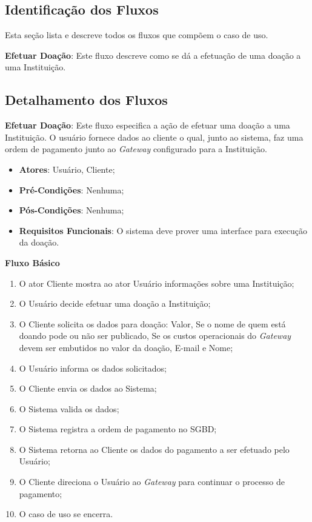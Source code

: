 \begin{anexosenv}
\subsection*{Identificação dos Fluxos}
Esta seção lista e descreve todos os fluxos que compõem o caso de uso.
\begin{lista}
  \item \textbf{Efetuar Doação}: Este fluxo descreve como se dá a efetuação de uma doação a uma Instituição.
\end{lista}

\subsection*{Detalhamento dos Fluxos}
\begin{lista}
  \item \textbf{Efetuar Doação}: Este fluxo especifica a ação de efetuar uma doação a uma Instituição. O usuário fornece dados ao cliente o qual, junto ao sistema, faz uma ordem de pagamento junto ao \emph{Gateway} configurado para a Instituição.
    \begin{itemize}
    \item \textbf{Atores}: Usuário, Cliente;
    \item \textbf{Pré-Condições}: Nenhuma;
    \item \textbf{Pós-Condições}: Nenhuma;
    \item \textbf{Requisitos Funcionais}: O sistema deve prover uma interface para execução da doação.
    \end{itemize}
	
    \textbf{Fluxo Básico}
    \begin{enumerate}
    \item O ator Cliente mostra ao ator Usuário informações sobre uma Instituição;
    \item O Usuário decide efetuar uma doação a Instituição;
    \item O Cliente solicita os dados para doação: Valor, Se o nome de quem está doando pode ou não ser publicado, Se os custos operacionais do \emph{Gateway} devem ser embutidos no valor da doação, E-mail e Nome;
    \item O Usuário informa os dados solicitados;
    \item O Cliente envia os dados ao Sistema;
    \item O Sistema valida os dados;
    \item O Sistema registra a ordem de pagamento no SGBD;
    \item O Sistema retorna ao Cliente os dados do pagamento a ser efetuado pelo Usuário;
    \item O Cliente direciona o Usuário ao \emph{Gateway} para continuar o processo de pagamento;
    \item O caso de uso se encerra.
    \end{enumerate}
    

\end{lista}
\end{anexosenv}
